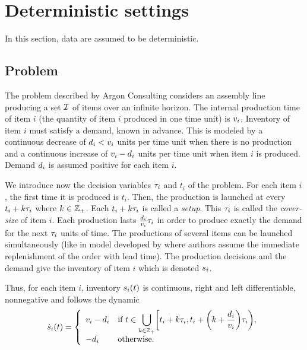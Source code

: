\section{Deterministic settings}
\label{sec:lot-size:single-line:deterministic}


In this section, data are assumed to be deterministic.


\subsection{Problem}
\label{sec:lot-size:single-line:deterministic:problems}


The problem described by Argon Consulting considers an assembly line producing a set $\mathcal{I}$ of items over an infinite horizon.
The internal production time of item $i$ (\ie the quantity of item $i$ produced in one time unit) is $v_i$.
Inventory of item $i$ must satisfy a demand, known in advance.
This is modeled by a continuous decrease of $d_i<v_i$ units per time unit when there is no production and a continuous increase of $v_i-d_i$ units per time unit when item $i$ is produced.
Demand $d_i$ is assumed positive for each item $i$.


We introduce now the decision variables $\tau_i$ and $t_i$ of the problem.
For each item $i$, the first time it is produced is $t_i$.
Then, the production is launched at every $t_i+k\tau_i$ where $k\in\mathbb{Z}_+$.
Each $t_i+k\tau_i$ is called a \emph{setup}.
This $\tau_i$ is called the \emph{cover-size} of item $i$.
Each production lasts $\frac{d_i}{v_i}\tau_i$ in order to produce exactly the demand for the next $\tau_i$ units of time.
The productions of several items can be launched simultaneously (like in model developed by \citet{Ohno2001} where authors assume the immediate replenishment of the order with lead time).
The production decisions and the demand give the inventory of item $i$ which is denoted $s_i$.


Thus, for each item $i$, inventory $\inventory_i\bracket{t}$ is continuous, right and left differentiable, nonnegative and follows the dynamic
\begin{equation}\label{eq:lot-size:single-line:deterministic:motivations:dynamic}
  \dot{\inventory}_i\bracket{t} =
  \left\{
  \begin{array}{ll}
  \rate_i-\demand_i
  & \ds\mbox{if}\ t\in\bigcup_{k\in\ZZ_+} \left[t_i+k\cover_i,t_i+\bracket{k+\frac{\demand_i}{\rate_i}}\cover_i\right),
  \\
  -\demand_i
  & \mbox{otherwise}.
  \end{array}
  \right.
\end{equation}


